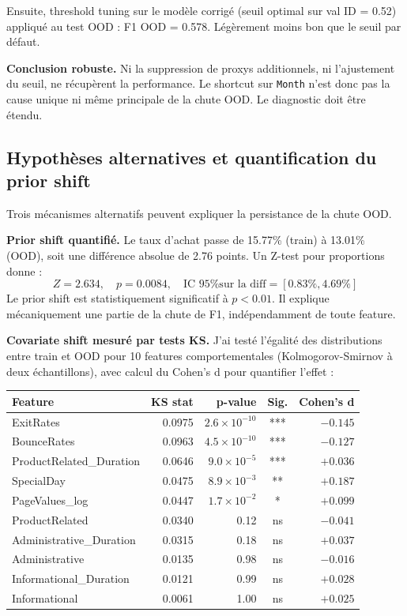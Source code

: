 \documentclass[11pt,a4paper]{article}
\newcommand{\code}[1]{\texttt{\small#1}}
\begin{document}
Ensuite, threshold tuning sur le modèle corrigé (seuil optimal sur val ID = 0.52) appliqué au test OOD : F1 OOD = 0.578. Légèrement moins bon que le seuil par défaut.

\textbf{Conclusion robuste.} Ni la suppression de proxys additionnels, ni l'ajustement du seuil, ne récupèrent la performance. Le shortcut sur \code{Month} n'est donc pas la cause unique ni même principale de la chute OOD. Le diagnostic doit être étendu.

\subsection*{Hypothèses alternatives et quantification du prior shift}

Trois mécanismes alternatifs peuvent expliquer la persistance de la chute OOD.

\textbf{Prior shift quantifié.} Le taux d'achat passe de 15.77\% (train) à 13.01\% (OOD), soit une différence absolue de 2.76 points. Un Z-test pour proportions donne :
\[
Z = 2.634, \quad p = 0.0084, \quad \text{IC 95\% sur la diff} = [0.83\%, 4.69\%]
\]
Le prior shift est statistiquement significatif à $p < 0.01$. Il explique mécaniquement une partie de la chute de F1, indépendamment de toute feature.

\textbf{Covariate shift mesuré par tests KS.} J'ai testé l'égalité des distributions entre train et OOD pour 10 features comportementales (Kolmogorov-Smirnov à deux échantillons), avec calcul du Cohen's d pour quantifier l'effet :

\begin{center}
\begin{tabular}{lrrcr}
\toprule
\textbf{Feature} & \textbf{KS stat} & \textbf{p-value} & \textbf{Sig.} & \textbf{Cohen's d} \\
\midrule
ExitRates                & 0.0975 & $2.6 \times 10^{-10}$ & *** & $-0.145$ \\
BounceRates              & 0.0963 & $4.5 \times 10^{-10}$ & *** & $-0.127$ \\
ProductRelated\_Duration & 0.0646 & $9.0 \times 10^{-5}$  & *** & $+0.036$ \\
SpecialDay               & 0.0475 & $8.9 \times 10^{-3}$  & **  & $+0.187$ \\
PageValues\_log          & 0.0447 & $1.7 \times 10^{-2}$  & *   & $+0.099$ \\
ProductRelated           & 0.0340 & 0.12 & ns & $-0.041$ \\
Administrative\_Duration & 0.0315 & 0.18 & ns & $+0.037$ \\
Administrative           & 0.0135 & 0.98 & ns & $-0.016$ \\
Informational\_Duration  & 0.0121 & 0.99 & ns & $+0.028$ \\
Informational            & 0.0061 & 1.00 & ns & $+0.025$ \\
\bottomrule
\end{tabular}
\end{center}
\end{document}
